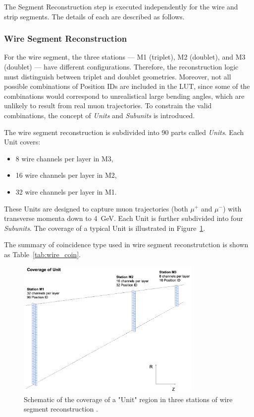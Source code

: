 The Segment Reconstruction step is executed independently for the wire and strip segments. The details of each are described as follows.

\subsubsection{Wire Segment Reconstruction}

For the wire segment, the three stations --- M1 (triplet), M2 (doublet), and M3 (doublet) --- have different configurations. Therefore, the reconstruction logic must distinguish between triplet and doublet geometries. Moreover, not all possible combinations of Position IDs are included in the LUT, since some of the combinations would correspond to unrealistical large bending angles, which are unlikely to result from real muon trajectories. To constrain the valid combinations, the concept of \textit{Units} and \textit{Subunits} is introduced.

The wire segment reconstruction is subdivided into 90 parts called \textit{Units}. Each Unit covers:
\begin{itemize}
  \item 8 wire channels per layer in M3,
  \item 16 wire channels per layer in M2,
  \item 32 wire channels per layer in M1.
\end{itemize}
These Units are designed to capture muon trajectories (both $\mu^+$ and $\mu^-$) with transverse momenta down to 4~GeV. Each Unit is further subdivided into four \textit{Subunits}. The coverage of a typical Unit is illustrated in Figure~\ref{fig:wire_unit}.

The summary of coincidence type used in wire segment reconstrutction is shown as Table~\ref{tab:wire_coin}.


\begin{figure}[htbp]
  \centering
  \includegraphics[width=0.8\textwidth]{figs/chapter5/wire_unit.png}
  \caption{Schematic of the coverage of a "Unit" region in three stations of wire segment reconstruction \cite{EndcapSLPDR}.}
  \label{fig:wire_unit}
\end{figure}

